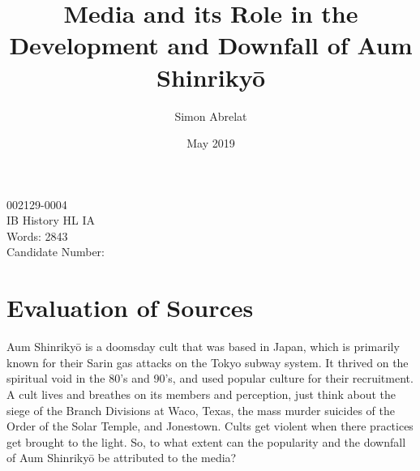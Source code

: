 \documentclass[12pt, letterpaper]{article}
\title{Media and its Role in the Development and Downfall of Aum Shinriky\=o}
\author{Simon Abrelat}
\date{May 2019}
\newcommand{\poses}[1]{#1's}
\begin{document}
\doublespace{}
\parindent=0.5in

{\fontsize{12}{14.4}
  {\singlespace
    \maketitle
    \begin{center}
    002129-0004 \\
    \vspace{4mm}
    IB History HL IA \\
    \vspace{4mm}
    Words: 2843 \\ %
    \vspace{4mm}
    Candidate Number: \\
    \end{center}
  }
}	


\newpage
\tableofcontents
{}
\newpage

\section{Evaluation of Sources}
Aum Shinriky\=o is a doomsday cult that was based in Japan, which is primarily known for their Sarin gas
attacks on the Tokyo subway system. It thrived on the spiritual void in the \poses{80} and  \poses{90},
and used popular culture for their recruitment. A cult lives and breathes on its members and perception,
just think about the siege of the Branch Divisions at Waco, Texas, the mass murder suicides of the Order of
the Solar Temple, and Jonestown. Cults get violent when there practices get brought to the light. So, to
what extent can the popularity and the downfall of Aum Shinriky\=o be attributed to the media?
\end{document}
